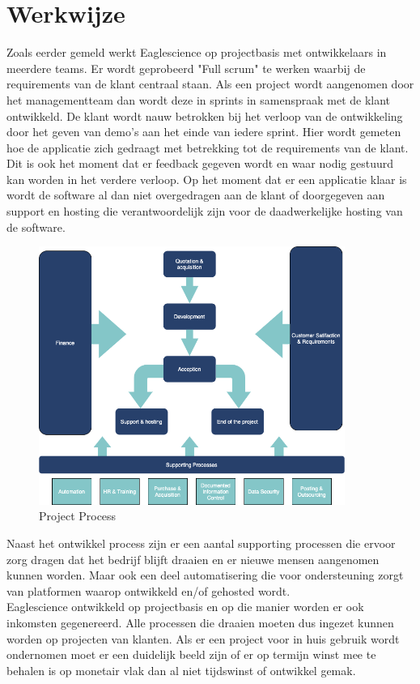 \section{Werkwijze}\label{sec:werkwijze}
Zoals eerder gemeld werkt Eaglescience op projectbasis met ontwikkelaars in meerdere teams.
Er wordt geprobeerd "Full scrum" te werken waarbij de requirements van de klant centraal staan.
Als een project wordt aangenomen door het managementteam dan wordt deze in sprints in samenspraak met de klant ontwikkeld.
De klant wordt nauw betrokken bij het verloop van de ontwikkeling door het geven van demo's aan het einde van iedere sprint.
Hier wordt gemeten hoe de applicatie zich gedraagt met betrekking tot de requirements van de klant.
Dit is ook het moment dat er feedback gegeven wordt en waar nodig gestuurd kan worden in het verdere verloop.
Op het moment dat er een applicatie klaar is wordt de software al dan niet overgedragen aan de klant of doorgegeven aan support en hosting die verantwoordelijk zijn voor de daadwerkelijke hosting van de software.

\begin{figure}[bth]
\myfloatalign
\includegraphics[width=10cm]{gfx/ProcessFlow}
\caption{Project Process}
\label{fig:Project Process}
\end{figure}

Naast het ontwikkel process zijn er een aantal supporting processen die ervoor zorg dragen dat het bedrijf blijft draaien en er nieuwe mensen aangenomen kunnen worden.
Maar ook een deel automatisering die voor ondersteuning zorgt van platformen waarop ontwikkeld en/of gehosted wordt.\\
Eaglescience ontwikkeld op projectbasis en op die manier worden er ook inkomsten gegenereerd.
Alle processen die draaien moeten dus ingezet kunnen worden op projecten van klanten.
Als er een project voor in huis gebruik wordt ondernomen moet er een duidelijk beeld zijn of er op termijn winst mee te behalen is op monetair vlak dan al niet tijdswinst of ontwikkel gemak.

